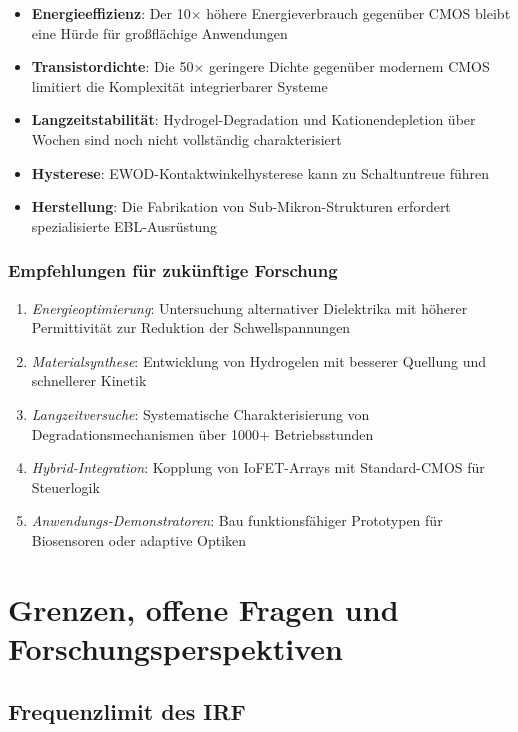 ﻿\documentclass[a4paper,12pt]{scrreprt}
\theoremstyle{definition}
\begin{document}
\begin{itemize}
	\item \textbf{Energieeffizienz}: Der 10$\times$ höhere Energieverbrauch gegenüber CMOS bleibt eine Hürde für großflächige Anwendungen
	\item \textbf{Transistordichte}: Die 50$\times$ geringere Dichte gegenüber modernem CMOS limitiert die Komplexität integrierbarer Systeme
	\item \textbf{Langzeitstabilität}: Hydrogel-Degradation und Kationendepletion über Wochen sind noch nicht vollständig charakterisiert
	\item \textbf{Hysterese}: EWOD-Kontaktwinkelhysterese kann zu Schaltuntreue führen
	\item \textbf{Herstellung}: Die Fabrikation von Sub-Mikron-Strukturen erfordert spezialisierte EBL-Ausrüstung
\end{itemize}

\subsubsection{Empfehlungen für zukünftige Forschung}

\begin{enumerate}
	\item \emph{Energieoptimierung}: Untersuchung alternativer Dielektrika mit höherer Permittivität zur Reduktion der Schwellspannungen
	\item \emph{Materialsynthese}: Entwicklung von Hydrogelen mit besserer Quellung und schnellerer Kinetik
	\item \emph{Langzeitversuche}: Systematische Charakterisierung von Degradationsmechanismen über 1000+ Betriebsstunden
	\item \emph{Hybrid-Integration}: Kopplung von IoFET-Arrays mit Standard-CMOS für Steuerlogik
	\item \emph{Anwendungs-Demonstratoren}: Bau funktionsfähiger Prototypen für Biosensoren oder adaptive Optiken
\end{enumerate}

\section{Grenzen, offene Fragen und Forschungsperspektiven}

\subsection{Frequenzlimit des IRF}
\end{document}
